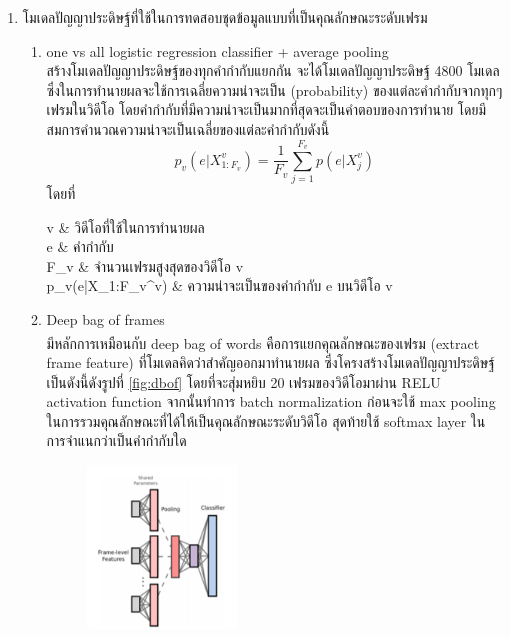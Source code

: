 \begin{enumerate}
\begin{enumerate}
		\item โมเดลปัญญาประดิษฐ์ที่ใช้ในการทดสอบชุดข้อมูลแบบที่เป็นคุณลักษณะระดับเฟรม
			\begin{enumerate}
				\setlength\itemsep{-0.25em}
				\item one vs all logistic regression classifier + average pooling\\ 
				สร้างโมเดลปัญญาประดิษฐ์ของทุกคำกำกับแยกกัน จะได้โมเดลปัญญาประดิษฐ์ 4800 โมเดล ซึ่งในการทำนายผลจะใช้การเฉลี่ยความน่าจะเป็น (probability) ของแต่ละคำกำกับจากทุกๆเฟรมในวิดีโอ
				โดยคำกำกับที่มีความน่าจะเป็นมากที่สุดจะเป็นคำตอบของการทำนาย โดยมีสมการคำนวณความน่าจะเป็นเฉลี่ยของแต่ละคำกำกับดังนี้
				\begin{equation}
					p_v(e|X_{1:F_v}^v) = \frac{1}{F_v} \sum_{j=1}^{F_v}p(e|X^v_j)
				\end{equation}
				โดยที่
				\begin{conditions}
					v      		&  วิดีโอที่ใช้ในการทำนายผล  \\   
					e 			&  คำกำกับ								\\
					F_v 		&  จำนวนเฟรมสูงสุดของวิดีโอ v	\\
					p_v(e|X_{1:F_v}^v)     	&  ความน่าจะเป็นของคำกำกับ e บนวิดีโอ v	\\
				\end{conditions}
				\item Deep bag of frames\\
				มีหลักการเหมือนกับ deep bag of words\textsuperscript{\cite{liu20172}} คือการแยกคุณลักษณะของเฟรม (extract frame feature) 
				ที่โมเดลคิดว่าสำคัญออกมาทำนายผล ซึ่งโครงสร้างโมเดลปัญญาประดิษฐ์เป็นดังนี้ดังรูปที่ \ref{fig:dbof} โดยที่จะสุ่มหยิบ 20 เฟรมของวิดีโอมาผ่าน RELU activation function
				จากนั้นทำการ batch normalization ก่อนจะใช้ max pooling ในการรวมคุณลักษณะที่ได้ให้เป็นคุณลักษณะระดับวิดีโอ สุดท้ายใช้ softmax layer ในการจำแนกว่าเป็นคำกำกับใด
				\begin{figure}[!ht]
					\centering
					\includegraphics[width=0.4\textwidth]{chapter2/images/DBoF.png}

\end{figure}
\end{enumerate}
\end{enumerate}
\end{enumerate}
